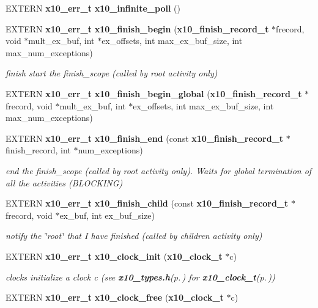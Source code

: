 \begin{CompactItemize}
EXTERN {\bf x10\_\-err\_\-t} {\bf x10\_\-infinite\_\-poll} ()
\item 
EXTERN {\bf x10\_\-err\_\-t} {\bf x10\_\-finish\_\-begin} ({\bf x10\_\-finish\_\-record\_\-t} $\ast$frecord, void $\ast$mult\_\-ex\_\-buf, int $\ast$ex\_\-offsets, int max\_\-ex\_\-buf\_\-size, int max\_\-num\_\-exceptions)
\begin{CompactList}\small\item\em finish start the finish\_\-scope (called by root activity only) \item\end{CompactList}\item 
EXTERN {\bf x10\_\-err\_\-t} {\bf x10\_\-finish\_\-begin\_\-global} ({\bf x10\_\-finish\_\-record\_\-t} $\ast$frecord, void $\ast$mult\_\-ex\_\-buf, int $\ast$ex\_\-offsets, int max\_\-ex\_\-buf\_\-size, int max\_\-num\_\-exceptions)
\item 
EXTERN {\bf x10\_\-err\_\-t} {\bf x10\_\-finish\_\-end} (const {\bf x10\_\-finish\_\-record\_\-t} $\ast$finish\_\-record, int $\ast$num\_\-exceptions)
\begin{CompactList}\small\item\em end the finish\_\-scope (called by root activity only). Waits for global termination of all the activities (BLOCKING) \item\end{CompactList}\item 
EXTERN {\bf x10\_\-err\_\-t} {\bf x10\_\-finish\_\-child} (const {\bf x10\_\-finish\_\-record\_\-t} $\ast$frecord, void $\ast$ex\_\-buf, int ex\_\-buf\_\-size)
\begin{CompactList}\small\item\em notify the \char`\"{}root\char`\"{} that I have finished (called by children activity only) \item\end{CompactList}\item 
EXTERN {\bf x10\_\-err\_\-t} {\bf x10\_\-clock\_\-init} ({\bf x10\_\-clock\_\-t} $\ast$c)
\begin{CompactList}\small\item\em clocks initialize a clock c (see {\bf x10\_\-types.h}{\rm (p.\,\pageref{x10__types_8h})} for {\bf x10\_\-clock\_\-t}{\rm (p.\,\pageref{structx10__clock__t})}) \item\end{CompactList}\item 
EXTERN {\bf x10\_\-err\_\-t} {\bf x10\_\-clock\_\-free} ({\bf x10\_\-clock\_\-t} $\ast$c)
\item 

\end{CompactItemize}
